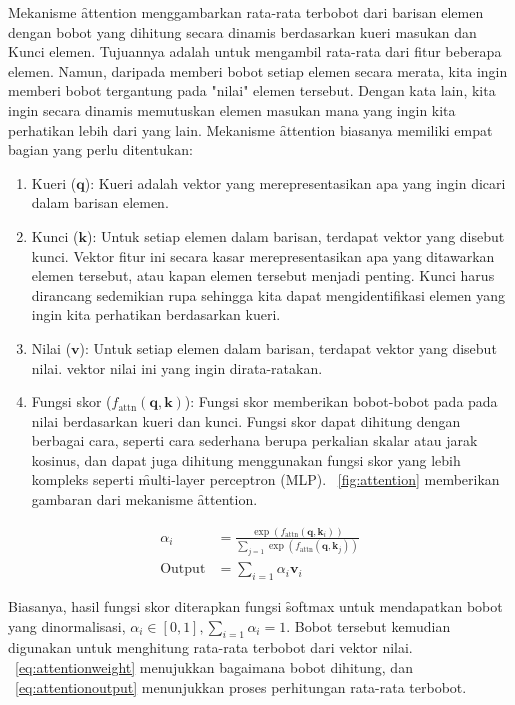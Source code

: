 Mekanisme \f{attention} menggambarkan rata-rata terbobot dari barisan elemen dengan bobot yang dihitung secara dinamis berdasarkan kueri masukan dan Kunci elemen. Tujuannya adalah untuk mengambil rata-rata dari fitur beberapa elemen. Namun, daripada memberi bobot setiap elemen secara merata, kita ingin memberi bobot tergantung pada "nilai" elemen tersebut. Dengan kata lain, kita ingin secara dinamis memutuskan elemen masukan mana yang ingin kita perhatikan lebih dari yang lain. Mekanisme \f{attention} biasanya memiliki empat bagian yang perlu ditentukan:

\begin{enumerate}
	\item Kueri ($\mathbf{q}$): Kueri adalah vektor yang merepresentasikan apa yang ingin dicari dalam barisan elemen.
	\item Kunci ($\mathbf{k}$): Untuk setiap elemen dalam barisan, terdapat vektor yang disebut kunci. Vektor fitur ini secara kasar merepresentasikan apa yang ditawarkan elemen tersebut, atau kapan elemen tersebut menjadi penting. Kunci harus dirancang sedemikian rupa sehingga kita dapat mengidentifikasi elemen yang ingin kita perhatikan berdasarkan kueri.
	\item Nilai ($\mathbf{v}$): Untuk setiap elemen dalam barisan, terdapat vektor yang disebut nilai. vektor nilai ini yang ingin dirata-ratakan.
	\item Fungsi skor ($f_{\text{attn}}(\mathbf{q}, \mathbf{k})$): Fungsi skor memberikan bobot-bobot pada pada nilai berdasarkan kueri dan kunci. Fungsi skor dapat dihitung dengan berbagai cara, seperti cara sederhana berupa perkalian skalar atau jarak kosinus, dan dapat juga dihitung menggunakan fungsi skor yang lebih kompleks seperti \f{multi-layer perceptron} (MLP). \pic~\ref{fig:attention} memberikan gambaran dari mekanisme \f{attention}.
\end{enumerate}

\noindent\begin{align}
	\alpha_i &= \frac{\exp(f_{\text{attn}}(\mathbf{q}, \mathbf{k}_i))}{\sum_{j=1}\exp(f_{\text{attn}}(\mathbf{q}, \mathbf{k}_j))} \label{eq:attentionweight}\\
	\text{Output} &= \sum_{i=1} \alpha_i \mathbf{v}_i \label{eq:attentionoutput}
\end{align}

Biasanya, hasil fungsi skor diterapkan fungsi \f{softmax} untuk mendapatkan bobot yang dinormalisasi, $\alpha_i \in [0, 1], \sum_{i=1} \alpha_i = 1$. Bobot tersebut kemudian digunakan untuk menghitung rata-rata terbobot dari vektor nilai. \equ~\ref{eq:attentionweight} menujukkan bagaimana bobot dihitung, dan \equ~\ref{eq:attentionoutput} menunjukkan proses perhitungan rata-rata terbobot.

